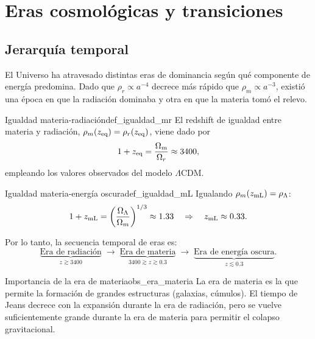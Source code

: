 \section{Eras cosmológicas y transiciones}
\label{sec:eras_cosmologicas}

\subsection{Jerarquía temporal}

El Universo ha atravesado distintas eras de dominancia según qué componente de energía predomina. Dado que $\rho_r\propto a^{-4}$ decrece más rápido que $\rho_m\propto a^{-3}$, existió una época en que la radiación dominaba y otra en que la materia tomó el relevo.

\begin{definicion}{Igualdad materia-radiación}{def_igualdad_mr}
El redshift de igualdad entre materia y radiación, $\rho_m(z_{\rm eq})=\rho_r(z_{\rm eq})$, viene dado por
\begin{equation}
  1+z_{\rm eq} = \frac{\Omega_m}{\Omega_r} \approx 3400,
\end{equation}
empleando los valores observados del modelo $\Lambda$CDM.
\end{definicion}

\begin{definicion}{Igualdad materia-energía oscura}{def_igualdad_mL}
Igualando $\rho_m(z_{\rm mL})=\rho_\Lambda$:
\begin{equation}
  1+z_{\rm mL} = \left(\frac{\Omega_\Lambda}{\Omega_m}\right)^{1/3} \approx 1.33\quad\Rightarrow\quad z_{\rm mL}\approx 0.33.
\end{equation}
\end{definicion}

Por lo tanto, la secuencia temporal de eras es:
\begin{equation}
  \underbrace{\text{Era de radiación}}_{z\gtrsim3400}
  \;\longrightarrow\;
  \underbrace{\text{Era de materia}}_{3400\gtrsim z\gtrsim0.3}
  \;\longrightarrow\;
  \underbrace{\text{Era de energía oscura}}_{z\lesssim0.3}.
\end{equation}

\begin{observacion}{Importancia de la era de materia}{obs_era_materia}
La era de materia es la que permite la formación de grandes estructuras (galaxias, cúmulos). El tiempo de Jeans decrece con la expansión durante la era de radiación, pero se vuelve suficientemente grande durante la era de materia para permitir el colapso gravitacional.
\end{observacion}

